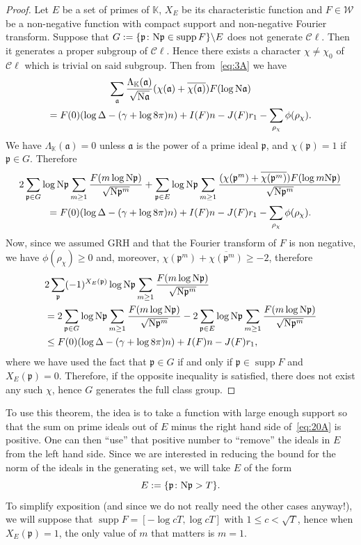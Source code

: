 \documentclass[a4paper,11pt]{amsart}
\newcommand{\field}[1]{\mathbb{{#1}}}
\newcommand{\ideal}[1]{\mathfrak{{#1}}}
\newcommand{\K}{\field{{K}}}
\newcommand{\p}{\ideal{p}}
\renewcommand{\a}{\ideal{a}}
\newcommand{\Norm}{\textrm{\upshape N}}
\newcommand{\Cl}{\mathcal C\!\ell}
\newcommand{\W}{\mathcal W}
\DeclareMathOperator{\supp}{supp}
\theoremstyle{remark}
\begin{document}
\begin{proof}
Let $E$ be a set of primes of $\K$, $X_E$ be its characteristic function and $F\in\W$ be a non-negative
function with compact support and non-negative Fourier transform. Suppose that $G:=\{\p\colon
\Norm\p\in\supp F\}\backslash E$ does not generate $\Cl$. Then it generates a proper subgroup of $\Cl$.
Hence there exists a character $\chi\neq \chi_0$ of $\Cl$ which is trivial on said subgroup. Then
from~\eqref{eq:3A} we have
\begin{multline*}
\sum_{\a} \frac{\Lambda_{\K}(\a)}{\sqrt{\Norm\a}}(\chi(\a)+\overline{\chi(\a)}) F(\log \Norm\a) \\
= F(0)(\log \Delta - (\gamma+\log 8\pi)n)
  + I(F) n
  - J(F) r_1
  - \sum_{\rho_\chi} \phi(\rho_\chi).
\end{multline*}
We have $\Lambda_\K(\a)=0$ unless $\a$ is the power of a prime ideal $\p$, and $\chi(\p)=1$ if
$\p\in G$. Therefore
\begin{multline*}
2\sum_{\p\in G} \log\Norm\p\sum_{m\geq 1}\frac{F(m\log \Norm\p)}{\sqrt{\Norm\p^m}}
+\sum_{\p\in E} \log\Norm\p\sum_{m\geq 1}\frac{(\chi(\p^m)+\overline{\chi(\p^m)})F(\log m\Norm\p)}{\sqrt{\Norm\p^m}} \\
= F(0)(\log \Delta - (\gamma+\log 8\pi)n)
  + I(F) n
  - J(F) r_1
  - \sum_{\rho_\chi} \phi(\rho_\chi).
\end{multline*}
Now, since we assumed GRH and that the Fourier transform of $F$ is non negative, we have
$\phi(\rho_\chi)\geq 0$ and, moreover, $\chi(\p^m)+\overline{\chi(\p^m)}\geq -2$, therefore
\begin{align*}
&  2\sum_{\p} (-1)^{X_E(\p)}\log\Norm\p\sum_{m\geq 1}\frac{F(m\log \Norm\p)}{\sqrt{\Norm\p^m}} \\
&= 2\sum_{\p\in G} \log\Norm\p\sum_{m\geq 1}\frac{F(m\log \Norm\p)}{\sqrt{\Norm\p^m}}
  -2\sum_{\p\in E} \log\Norm\p\sum_{m\geq 1}\frac{F(m\log \Norm\p)}{\sqrt{\Norm\p^m}}          \\
&\leq F(0)(\log \Delta - (\gamma+\log 8\pi)n)
  + I(F) n
  - J(F) r_1,
\end{align*}
where we have used the fact that $\p\in G$ if and only if $\p\in\supp F$ and $X_E(\p)=0$. Therefore, if
the opposite inequality is satisfied, there does not exist any such $\chi$, hence $G$ generates the full
class group.
\end{proof}
%
To use this theorem, the idea is to take a function with large enough support so that the sum on prime
ideals out of $E$ minus the right hand side of~\eqref{eq:20A} is positive. One can then ``use'' that
positive number to ``remove'' the ideals in $E$ from the left hand side. Since we are interested in
reducing the bound for the norm of the ideals in the generating set, we will take $E$ of the form
\[
E:=\{\p\colon\Norm\p> T\}.
\]
To simplify exposition (and since we do not really need the other cases anyway!), we will suppose that
$\supp F=[-\log cT,\log cT]$ with $1\leq c<\sqrt{T}$, hence when $X_E(\p)=1$, the only value of $m$ that
matters is $m=1$.
\end{document}
